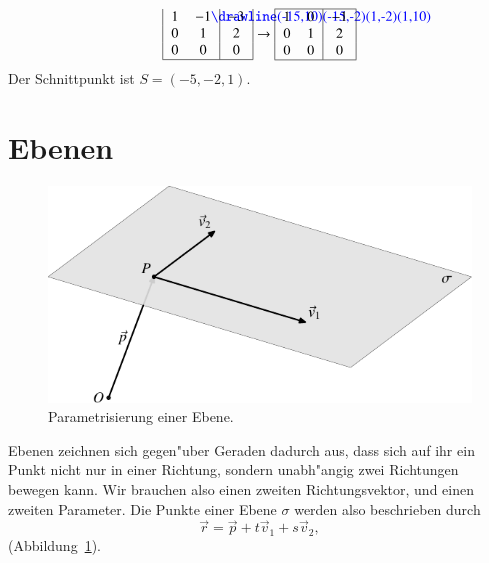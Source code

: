 \begin{beispiel}
\begin{align*}
\begin{tabular}{|>{$}c<{$}>{$}c<{$}|>{$}c<{$}|}
1&-1%
\begin{picture}(0,0)%
\color{blue}\drawline(-15,10)(-15,-2)(1,-2)(1,10)
\end{picture}%
&-3\\
0& 1& 2\\
0& 0& 0\\
\hline
\end{tabular}
\rightarrow
\begin{tabular}{|>{$}c<{$}>{$}c<{$}|>{$}c<{$}|}
\hline
1& 0&-1\\
0& 1& 2\\
0& 0& 0\\
\hline
\end{tabular}
\end{align*}
Der Schnittpunkt ist $S=(-5,-2,1)$.
\end{beispiel}

\section{Ebenen}
\begin{figure}
\begin{center}
\includegraphics{images/v-8}
\end{center}
\caption{Parametrisierung einer Ebene.\label{image-parametrisierungebene}}
\end{figure}%
Ebenen zeichnen sich gegen"uber Geraden dadurch aus, dass sich auf ihr
ein Punkt nicht nur in einer Richtung, sondern unabh"angig zwei Richtungen
bewegen kann. Wir brauchen also einen zweiten Richtungsvektor, und einen
zweiten Parameter. Die Punkte einer Ebene $\sigma$ werden also beschrieben durch
\[
\vec r=\vec p+t\vec v_1+s\vec v_2,
\]
(Abbildung~\ref{image-parametrisierungebene}).

